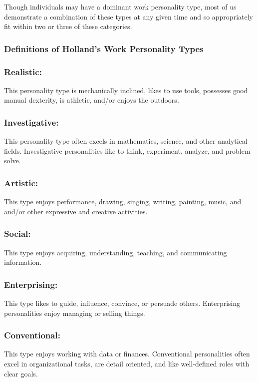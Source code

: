 Though individuals may have a dominant work personality type, most of us demonstrate a combination of these types at any given time and so appropriately fit within two or three of these categories.
\subsubsection*{Definitions of Holland's Work Personality Types}
\subsubsection*{Realistic:} This personality type is mechanically inclined, likes to use tools, possesses good manual dexterity, is athletic, and/or enjoys the outdoors.

\subsubsection*{Investigative:} This personality type often excels in mathematics, science, and other analytical fields. Investigative personalities like to think, experiment, analyze, and problem solve.

\subsubsection*{Artistic:} This type enjoys performance, drawing, singing, writing, painting, music, and and/or other expressive and creative activities.

\subsubsection*{Social:} This type enjoys acquiring, understanding, teaching, and communicating information.

\subsubsection*{Enterprising:} This type likes to guide, influence, convince, or persuade others. Enterprising personalities enjoy managing or selling things.

\subsubsection*{Conventional:} This type enjoys working with data or finances. Conventional personalities often excel in organizational tasks, are detail oriented, and like well-defined roles with clear goals.

